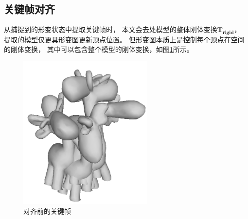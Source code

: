 \subsection{关键帧对齐}
从捕捉到的形变状态中提取关键帧时，
本文会去处模型的整体刚体变换$\bm{T_{rigid}}$，
提取的模型仅更具形变图更新顶点位置。
但形变图本质上是控制每个顶点在空间的刚体变换，
其中可以包含整个模型的刚体变换，如图\ref{before_align}所示。
\begin{figure}
    \centering
    \includegraphics[width = 0.6\textwidth]{./Pictures/before_align.png}
    \caption{对齐前的关键帧}
    \label{before_align}
\end{figure}

